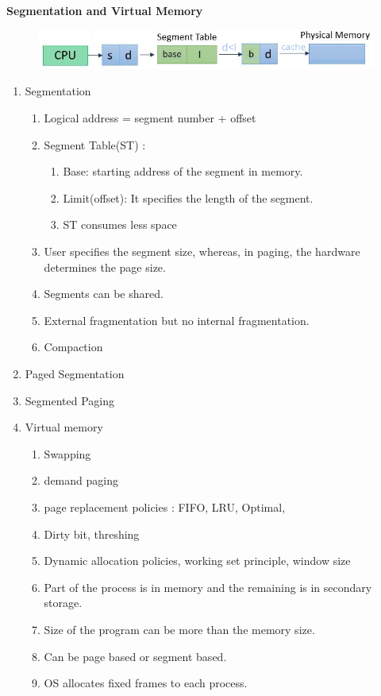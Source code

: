 
\centerline{\textbf{ \LARGE Segmentation and Virtual Memory}}




  \begin{figure}[h]
      \centering   \includegraphics[scale=2.5]{./images/segmentation_01.jpeg}
  \end{figure}

\begin{enumerate}

  \item Segmentation
  \begin{enumerate}
    \item Logical address = segment number + offset
    \item Segment Table(ST) :
    \begin{enumerate}
      \item Base: starting address of the segment in memory.
      \item Limit(offset): It specifies the length of the segment.
      \item ST consumes less space
    \end{enumerate}
  \item User specifies the segment size, whereas, in paging, the hardware determines the page size.
  \item Segments can be shared.
  \item External fragmentation but no internal fragmentation.
  \item Compaction
  \end{enumerate}

  \item Paged Segmentation
  \item Segmented Paging
  \item Virtual memory
    \begin{enumerate}
    \item Swapping
    \item demand paging
    \item page replacement policies : FIFO, LRU, Optimal,
    \item Dirty bit, threshing
    \item Dynamic allocation policies, working set principle, window size
    \item Part of the process is in memory and the remaining is in secondary storage.
    \item Size of the program can be more than the memory size.
    \item Can be page based or segment based.
    \item OS allocates fixed frames to each process.
  \end{enumerate}


\end{enumerate}

